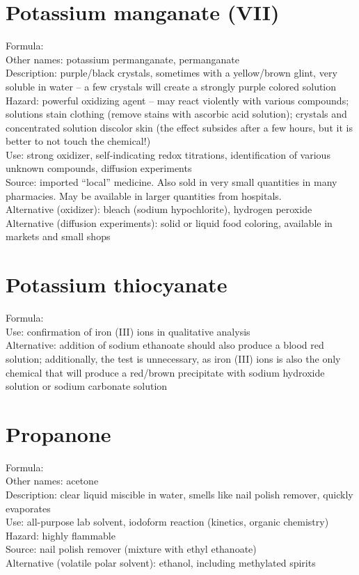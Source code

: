 \section{Potassium manganate (VII)}
Formula: \\
Other names: potassium permanganate, 
permanganate\\
Description: purple/black crystals, 
sometimes with a yellow/brown glint, 
very soluble in water -- 
a few crystals will create a strongly purple colored solution\\
Hazard: powerful oxidizing agent -- 
may react violently with various compounds; 
solutions stain clothing (remove stains with ascorbic acid solution); 
crystals and concentrated solution discolor skin 
(the effect subsides after a few hours, 
but it is better to not touch the chemical!)\\
Use: strong oxidizer, 
self-indicating redox titrations, 
identification of various unknown compounds, 
diffusion experiments\\
Source: imported ``local'' medicine. 
Also sold in very small quantities in many pharmacies. 
May be available in larger quantities from hospitals.\\
Alternative (oxidizer): bleach (sodium hypochlorite), 
hydrogen peroxide\\
Alternative (diffusion experiments): solid or liquid food coloring, 
available in markets and small shops

\section{Potassium thiocyanate}
Formula: \\
Use: confirmation of iron (III) ions in qualitative analysis\\
Alternative: addition of sodium ethanoate 
should also produce a blood red solution; 
additionally, 
the test is unnecessary, 
as iron (III) ions is also the only chemical 
that will produce a red/brown precipitate 
with sodium hydroxide solution or sodium carbonate solution

\section{Propanone}
\label{sec:propanone}
Formula: \\
Other names: acetone\\
Description: clear liquid miscible in water, 
smells like nail polish remover, 
quickly evaporates\\
Use: all-purpose lab solvent, 
iodoform reaction (kinetics, organic chemistry)\\
Hazard: highly flammable\\
Source: nail polish remover (mixture with ethyl ethanoate)\\
Alternative (volatile polar solvent): ethanol, 
including methylated spirits

